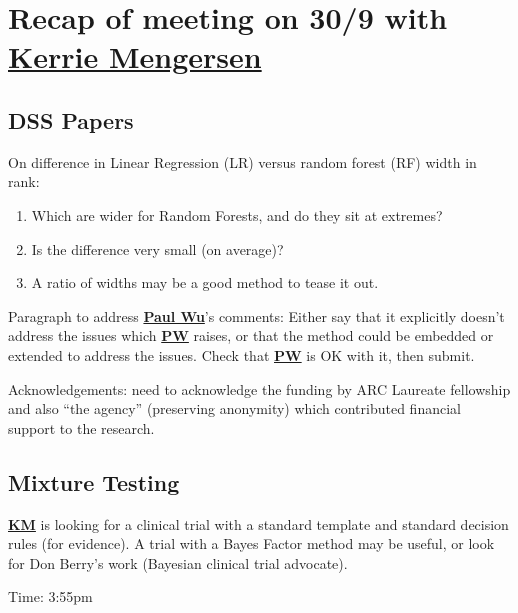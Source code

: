 \documentclass[10pt]{article}
\begin{document}




\section*{Recap of meeting on 30/9 with \href{mailto:k.mengersen@qut.edu.au}{\textbf{Kerrie Mengersen}}}



\subsection*{DSS Papers}
On difference in Linear Regression (LR) versus random forest (RF) width in rank:
\begin{enumerate}
    \item Which are wider for Random Forests, and do they sit at extremes?
    \item Is the difference very small (on average)?
    \item A ratio of widths may be a good method to tease it out.
\end{enumerate}

Paragraph to address \href{mailto:p.wu@qut.edu.au}{\textbf{Paul Wu}}'s comments: Either say that it explicitly doesn't address the issues which \href{mailto:p.wu@qut.edu.au}{\textbf{PW}} raises, or that the method could be embedded or extended to address the issues. Check that \href{mailto:p.wu@qut.edu.au}{\textbf{PW}} is OK with it, then submit.

Acknowledgements: need to acknowledge the funding by ARC Laureate fellowship and also ``the agency'' (preserving anonymity) which contributed financial support to the research.
\subsection*{Mixture Testing}
\href{mailto:k.mengersen@qut.edu.au}{\textbf{KM}} is looking for a clinical trial with a standard template and standard decision rules (for evidence). A trial with a Bayes Factor method may be useful, or look for Don Berry's work (Bayesian clinical trial advocate).




Time: 3:55pm

  
\end{document}
